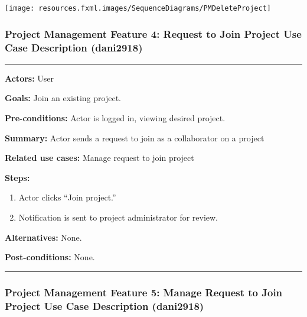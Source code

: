 \documentclass[twoside,letterpaper]{article}
\begin{document}
\bigskip
\label{pm:sd4}
\texttt{[image: resources.fxml.images/SequenceDiagrams/PMDeleteProject]}


\newpage



\subsubsection[Project Management Feature 4: Request to Join Project Use Case Description (dani2918)]{\rmfamily\bfseries\color{black}
	Project Management Feature 4: Request to Join Project Use Case Description (dani2918)}
\hypertarget{RefHeading22059017292}{}
\bigskip
\label{pm:uc6}

\vspace{2pt}
\hrule
\vspace{8pt}
\noindent \textbf{Actors:} User \newline

\noindent\textbf{Goals:} Join an existing project. \newline

\noindent \textbf{Pre-conditions:} Actor is logged in, viewing desired project.  \newline

\noindent \textbf{Summary:} Actor sends a request to join as a collaborator on a project\newline

\noindent \textbf{Related use cases:} Manage request to join project\newline

\noindent \textbf{Steps:} \begin{enumerate}
  \item Actor clicks ``Join project.''
  \item Notification is sent to project administrator for review.
 \end{enumerate}
\noindent \textbf{Alternatives:} None. \newline
 
\noindent \textbf{Post-conditions:} None. \newline
\vspace{8pt}
\hrule


\newpage



\subsubsection[Project Management Feature 5: Manage Request to Join Project Use Case Description (dani2918)]{\rmfamily\bfseries\color{black}
	Project Management Feature 5: Manage Request to Join Project Use Case Description (dani2918)}
\hypertarget{RefHeading22059017292}{}
\bigskip
\end{document}
